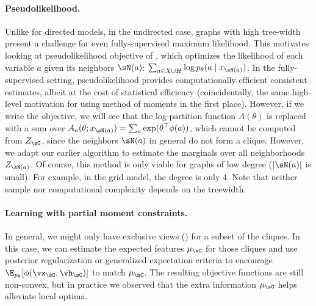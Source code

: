 \paragraph{Pseudolikelihood.}
Unlike for directed models, in the undirected case,
graphs with high tree-width present a challenge
for even fully-supervised maximum likelihood.
This motivates looking at pseudolikelihood objective of \citep{besag75pseudo},
which optimizes the likelihood of each variable $a$ given its neighbors $\sN(a)$:
$\sum_{a \in X \cup H} \log p_\theta(a \mid x_{\sN(a)})$.
In the fully-supervised setting, pseudolikelihood provides computationally efficient consistent estimates,
albeit at the cost of statistical efficiency
(coincidentally, the same high-level motivation for using method of moments in the first place).
However, if we write the objective, we will see that the log-partition function $A(\theta)$
is replaced with a sum over $A_a(\theta; x_{\sN(a)}) = \sum_a \exp(\theta^\top\phi(a))$,
which cannot be computed from $Z_\sC$, since the neighbors $\sN(a)$ in general do not form a clique.
However, we adapt our earlier algorithm to estimate the marginals over all neighborhoods $Z_{\sN(a)}$.
Of course, this method is only viable for graphs of low degree ($|\sN(a)|$ is small).
For example, in the grid model, the degree is only 4.
Note that neither sample nor computational complexity depends on the treewidth.

\paragraph{Learning with partial moment constraints.}

In general, we might only have exclusive views () for a subset of the cliques.
In this case, we can estimate the expected features $\mu_\sC$ for those cliques
and use posterior regularization \citep{graca08em} or generalized expectation criteria \citep{mann08ge}
to encourage $\E_{p_\theta}[\phi(\vx_\sC,\vh_\sC)]$ to match $\mu_\sC$.
The resulting objective functions are still non-convex, but in practice we observed
that the extra information $\mu_\sC$ helps alleviate local optima.

